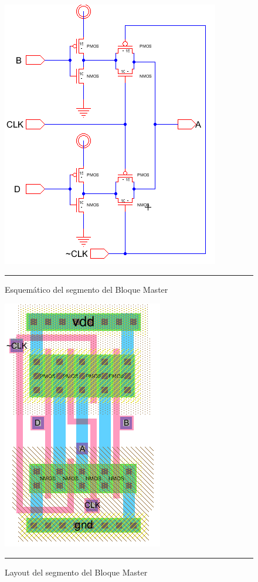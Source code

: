 \documentclass[12pt,a4paper]{article} %
\begin{document}
\begin{figure}[htbp]
  \centering
    \includegraphics[scale=0.45]{./Master_s.png}
    \rule{35em}{0.5pt}
  \caption[Master]{Esquemático del segmento del Bloque Master}
  \label{fig:Master_s}
\end{figure}

\begin{figure}[htbp]
  \centering
    \includegraphics[scale=0.6]{./Master_l.png}
    \rule{35em}{0.5pt}
  \caption[Master]{Layout del segmento del Bloque Master}
  \label{fig:Master_l}
\end{figure}
\end{document}
